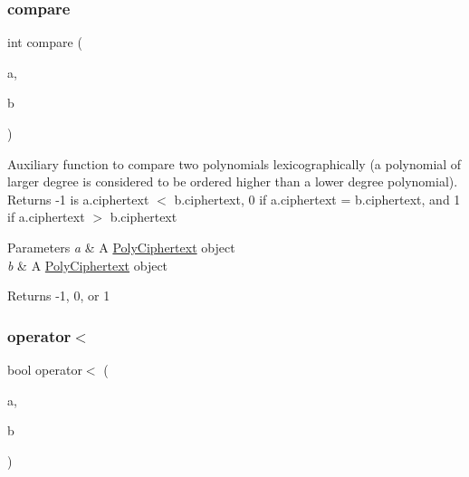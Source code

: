 \mbox{\label{classPolyCiphertext_a2a25d0399b812261d703d84fd3a21fb9}} 
\subsubsection{\texorpdfstring{compare}{compare}}
{\footnotesize\ttfamily int compare (\begin{DoxyParamCaption}\item[{const \hyperlink{classPolyCiphertext}{Poly\+Ciphertext} \&}]{a,  }\item[{const \hyperlink{classPolyCiphertext}{Poly\+Ciphertext} \&}]{b }\end{DoxyParamCaption})\hspace{0.3cm}{\ttfamily [friend]}}

Auxiliary function to compare two polynomials lexicographically (a polynomial of larger degree is considered to be ordered higher than a lower degree polynomial). Returns -\/1 is {\ttfamily a.\+ciphertext} $<$ {\ttfamily b.\+ciphertext}, 0 if {\ttfamily a.\+ciphertext} = {\ttfamily b.\+ciphertext}, and 1 if {\ttfamily a.\+ciphertext} $>$ {\ttfamily b.\+ciphertext} 
\begin{DoxyParams}{Parameters}
{\em a} & A {\ttfamily \hyperlink{classPolyCiphertext}{Poly\+Ciphertext}} object \\
\hline
{\em b} & A {\ttfamily \hyperlink{classPolyCiphertext}{Poly\+Ciphertext}} object \\
\hline
\end{DoxyParams}
\begin{DoxyReturn}{Returns}
-\/1, 0, or 1 
\end{DoxyReturn}
\mbox{\label{classPolyCiphertext_ab5a64cd27170239ff233b1a17f5b0de9}} 
\subsubsection{\texorpdfstring{operator$<$}{operator<}}
{\footnotesize\ttfamily bool operator$<$ (\begin{DoxyParamCaption}\item[{const \hyperlink{classPolyCiphertext}{Poly\+Ciphertext} \&}]{a,  }\item[{const \hyperlink{classPolyCiphertext}{Poly\+Ciphertext} \&}]{b }\end{DoxyParamCaption})\hspace{0.3cm}{\ttfamily [friend]}}

